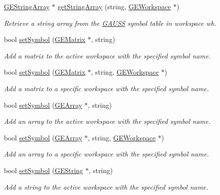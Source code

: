 \begin{DoxyCompactItemize}
\hyperlink{class_g_e_string_array}{G\-E\-String\-Array} $\ast$ \hyperlink{class_g_a_u_s_s_aaec58da4530de9e471961a6ff0df79b5}{get\-String\-Array} (string, \hyperlink{class_g_e_workspace}{G\-E\-Workspace} $\ast$)
\begin{DoxyCompactList}\small\item\em Retrieve a string array from the \hyperlink{class_g_a_u_s_s}{G\-A\-U\-S\-S} symbol table in workspace {\itshape wh}. \end{DoxyCompactList}\item 
bool \hyperlink{class_g_a_u_s_s_ac3c631a4d751917f3dd5ec60e48ca908}{set\-Symbol} (\hyperlink{class_g_e_matrix}{G\-E\-Matrix} $\ast$, string)
\begin{DoxyCompactList}\small\item\em Add a matrix to the active workspace with the specified symbol name. \end{DoxyCompactList}\item 
bool \hyperlink{class_g_a_u_s_s_ab90cec0135942174b273fd5c258b9740}{set\-Symbol} (\hyperlink{class_g_e_matrix}{G\-E\-Matrix} $\ast$, string, \hyperlink{class_g_e_workspace}{G\-E\-Workspace} $\ast$)
\begin{DoxyCompactList}\small\item\em Add a matrix to a specific workspace with the specified symbol name. \end{DoxyCompactList}\item 
bool \hyperlink{class_g_a_u_s_s_a1f1103240f897c011dfa4fd47e9e6c31}{set\-Symbol} (\hyperlink{class_g_e_array}{G\-E\-Array} $\ast$, string)
\begin{DoxyCompactList}\small\item\em Add an array to the active workspace with the specified symbol name. \end{DoxyCompactList}\item 
bool \hyperlink{class_g_a_u_s_s_adcf2392951e17e477cd4a39a7a8de69c}{set\-Symbol} (\hyperlink{class_g_e_array}{G\-E\-Array} $\ast$, string, \hyperlink{class_g_e_workspace}{G\-E\-Workspace} $\ast$)
\begin{DoxyCompactList}\small\item\em Add an array to a specific workspace with the specified symbol name. \end{DoxyCompactList}\item 
bool \hyperlink{class_g_a_u_s_s_a1d535463b5f181866233cde1e1de91fa}{set\-Symbol} (\hyperlink{class_g_e_string}{G\-E\-String} $\ast$, string)
\begin{DoxyCompactList}\small\item\em Add a string to the active workspace with the specified symbol name. \end{DoxyCompactList}\item 

\end{DoxyCompactItemize}
